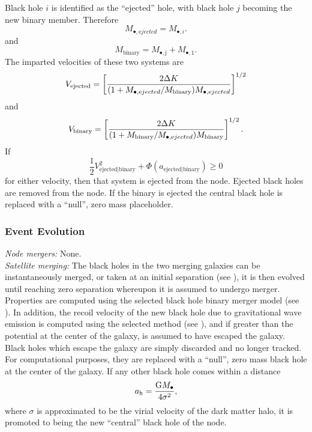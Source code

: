 Black hole $i$ is identified as the ``ejected'' hole, with black hole $j$ becoming the new binary member. Therefore
\begin{equation}
 M_{\bullet, \mathrm ejected} = M_{\bullet, i}.
\end{equation}
and
\begin{equation}
 M_\mathrm{binary} = M_\mathrm{\bullet, j} + M_\mathrm{\bullet, 1}.
\end{equation}
The imparted velocities of these two systems are
\begin{equation}
 V_\mathrm{ejected} = \left[ {2 \Delta K \over (1+M_{\bullet, \mathrm ejected}/M_\mathrm{binary} ) M_{\bullet, \mathrm ejected} }\right]^{1/2}
\end{equation}
and
\begin{equation}
 V_\mathrm{binary} = \left[ {2 \Delta K \over (1+M_\mathrm{binary} /M_{\bullet, \mathrm ejected}) M_\mathrm{binary}}\right]^{1/2}.
\end{equation}
If
\begin{equation}
 \frac{1}{2} V_\mathrm{ejected|binary}^2 + \Phi(a_\mathrm{ejected|binary}) \ge 0
\end{equation}
for either velocity, then that system is ejected from the node. Ejected black holes are removed from the node. If the binary is ejected the central black hole is replaced with a ``null'', zero mass placeholder.

\subsubsection{Event Evolution}

\noindent\emph{Node mergers:} None.\\

\noindent\emph{Satellite merging:} The black holes in the two merging galaxies can be instantaneously merged, or taken at an initial separation (see ), it is then evolved until reaching zero separation whereupon it is assumed to undergo merger. Properties are computed using the selected black hole binary merger model (see ). In addition, the recoil velocity of the new black hole due to gravitational wave emission is computed using the selected method (see ), and if greater than the potential at the center of the galaxy, is assumed to have escaped the galaxy. Black holes which escape the galaxy are simply discarded and no longer tracked. For computational purposes, they are replaced with a ``null'', zero mass black hole at the center of the galaxy. If any other black hole comes within a distance 
\begin{equation}
a_\mathrm{h} = {\mathrm{G} M_\bullet \over 4 \sigma^2},
\end{equation}
where $\sigma$ is approximated to be the virial velocity of the dark matter halo, it is promoted to being the new ``central'' black hole of the node.\\

